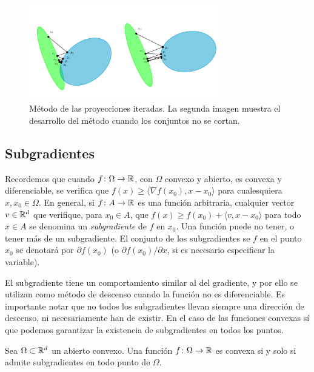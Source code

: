 \begin{figure}[h]
    \centering
    \includegraphics[width=0.75\textwidth]{./images/iterated_projections.png}
    \caption{Método de las proyecciones iteradas. La segunda imagen muestra el desarrollo del método cuando los conjuntos no se cortan.} \label{fig:iterproj}
\end{figure}

\subsection{Subgradientes}

Recordemos que cuando $f \colon \Omega \to \mathbb{R}$, con $\Omega$ convexo y abierto, es convexa y diferenciable, se verifica que $f(x) \ge \langle \nabla f(x_0), x - x_0 \rangle$ para cualesquiera $x,x_0 \in \Omega$. En general, si $f\colon A \to \mathbb{R}$ es una función arbitraria, cualquier vector $v \in \mathbb{R}^d$ que verifique, para $x_0 \in A$, que $f(x) \ge f(x_0)+ \langle v, x - x_0 \rangle$ para todo $x \in A$ se denomina un \emph{subgradiente} de $f$ en $x_0$. Una función puede no tener, o tener más de un subgradiente. El conjunto de los subgradientes se $f$ en el punto $x_0$ se denotará por $\partial f(x_0)$ (o $\partial f(x_0)/\partial x$, si es necesario especificar la variable).

El subgradiente tiene un comportamiento similar al del gradiente, y por ello se utilizan como método de descenso cuando la función no es diferenciable. Es importante notar que no todos los subgradientes llevan siempre una dirección de descenso, ni necesariamente han de existir. En el caso de las funciones convexas sí que podemos garantizar la existencia de subgradientes en todos los puntos.

\begin{prop}
    Sea $\Omega \subset \mathbb{R}^d$ un abierto convexo. Una función $f \colon \Omega \to \mathbb{R}$ es convexa si y solo si admite subgradientes en todo punto de $\Omega$.
\end{prop}

